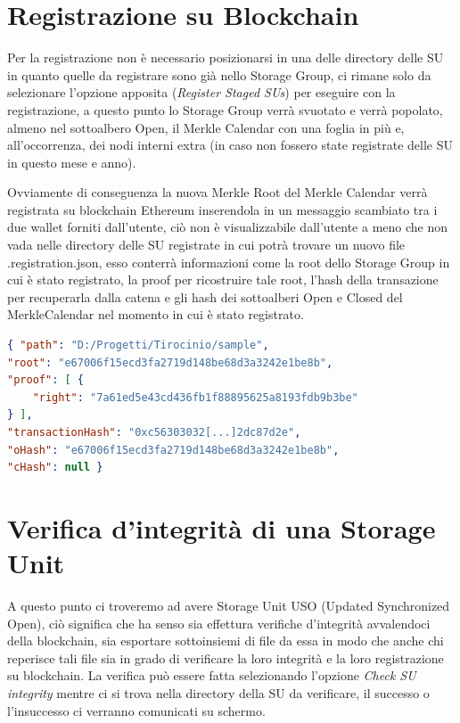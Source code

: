 \section{Registrazione su Blockchain}
\label{sub:regbc}
Per la registrazione non è necessario posizionarsi in una delle directory delle SU
in quanto quelle da registrare sono già nello Storage Group, ci rimane solo
da selezionare l'opzione apposita (\emph{Register Staged SUs}) per eseguire
con la registrazione, a questo punto lo Storage Group verrà svuotato
e verrà popolato, almeno nel sottoalbero Open, il Merkle Calendar con una foglia
in più e, all'occorrenza, dei nodi interni extra (in caso non fossero state
registrate delle SU in questo mese e anno).

Ovviamente di conseguenza la nuova Merkle Root del Merkle Calendar verrà registrata su
blockchain Ethereum inserendola in un messaggio scambiato tra i due wallet forniti dall'utente,
ciò non è visualizzabile dall'utente a meno che non vada nelle directory delle SU registrate 
in cui potrà trovare un nuovo file \textsf{.registration.json}, esso conterrà informazioni
come la root dello Storage Group in cui è stato registrato, la proof per ricostruire tale root,
l'hash della transazione per recuperarla dalla catena e gli hash dei sottoalberi Open e Closed
del MerkleCalendar nel momento in cui è stato registrato.

\singlespacing
\begin{lstlisting}[language=json,firstnumber=1]
{ "path": "D:/Progetti/Tirocinio/sample",
"root": "e67006f15ecd3fa2719d148be68d3a3242e1be8b",
"proof": [ {
    "right": "7a61ed5e43cd436fb1f88895625a8193fdb9b3be"
} ],
"transactionHash": "0xc56303032[...]2dc87d2e",
"oHash": "e67006f15ecd3fa2719d148be68d3a3242e1be8b",
"cHash": null }  
\end{lstlisting}
\onehalfspacing

\newpage

\section{Verifica d'integrità di una Storage Unit}

A questo punto ci troveremo ad avere Storage Unit USO (Updated Synchronized Open), ciò
significa che ha senso sia effettura verifiche d'integrità avvalendoci della blockchain,
sia esportare sottoinsiemi di file da essa in modo che anche chi reperisce tali file sia
in grado di verificare la loro integrità e la loro registrazione su blockchain.
La verifica può essere fatta selezionando l'opzione \emph{Check SU integrity}
mentre ci si trova nella directory della SU da verificare, il successo o
l'insuccesso ci verranno comunicati su schermo.

